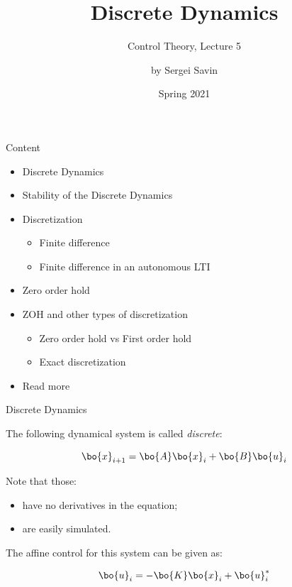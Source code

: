 \documentclass{beamer}
\title{Discrete Dynamics}
\subtitle{Control Theory, Lecture 5}
\author{by Sergei Savin}
\date{Spring 2021}
\begin{document}
\maketitle


\begin{frame}{Content}

\begin{itemize}
\item Discrete Dynamics
\item Stability of the Discrete Dynamics
\item Discretization
\begin{itemize}
    \item Finite difference
    \item Finite difference in an autonomous LTI
\end{itemize}
\item Zero order hold
\item ZOH and other types of discretization
\begin{itemize}
    \item Zero order hold vs First order hold
    \item Exact discretization
\end{itemize}
\item Read more
\end{itemize}

\end{frame}





\begin{frame}{Discrete Dynamics}
\begin{flushleft}

The following dynamical system is called \emph{discrete}:

\begin{equation}
    \bo{x}_{i+1} = \bo{A}\bo{x}_i + \bo{B}\bo{u}_i
\end{equation}

Note that those:

\begin{itemize}
    \item have no derivatives in the equation;
    \item are easily simulated.
\end{itemize}

\bigskip

The affine control for this system can be given as:

\begin{equation}
    \bo{u}_i = -\bo{K}\bo{x}_i + \bo{u}_i^*
\end{equation}

\end{flushleft}
\end{frame}
\end{document}
